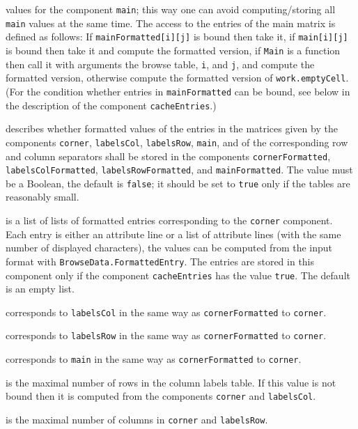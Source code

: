 \documentclass[a4paper,11pt]{report}
\begin{document}
{{{\begin{description}
values for the component \texttt{main}; this way one can avoid computing/storing all \texttt{main} values at the same time. The access to the entries of the main matrix is
defined as follows: If \texttt{mainFormatted[i][j]} is bound then take it, if \texttt{main[i][j]} is bound then take it and compute the formatted version, if \texttt{Main} is a function then call it with arguments the browse table, \texttt{i}, and \texttt{j}, and compute the formatted version, otherwise compute the formatted version
of \texttt{work.emptyCell}. (For the condition whether entries in \texttt{mainFormatted} can be bound, see below in the description of the component \texttt{cacheEntries}.) 
\item[{\texttt{cacheEntries}}]  describes whether formatted values of the entries in the matrices given by the
components \texttt{corner}, \texttt{labelsCol}, \texttt{labelsRow}, \texttt{main}, and of the corresponding row and column separators shall be stored in the
components \texttt{cornerFormatted}, \texttt{labelsColFormatted}, \texttt{labelsRowFormatted}, and \texttt{mainFormatted}. The value must be a Boolean, the default is \texttt{false}; it should be set to \texttt{true} only if the tables are reasonably small. 
\item[{\texttt{cornerFormatted}}]  is a list of lists of formatted entries corresponding to the \texttt{corner} component. Each entry is either an attribute line or a list of attribute lines
(with the same number of displayed characters), the values can be computed
from the input format with \texttt{BrowseData.FormattedEntry}.  The entries are stored in this component only if the component \texttt{cacheEntries} has the value \texttt{true}. The default is an empty list. 
\item[{\texttt{labelsColFormatted}}]  corresponds to \texttt{labelsCol} in the same way as \texttt{cornerFormatted} to \texttt{corner}. 
\item[{\texttt{labelsRowFormatted}}]  corresponds to \texttt{labelsRow} in the same way as \texttt{cornerFormatted} to \texttt{corner}. 
\item[{\texttt{mainFormatted}}]  corresponds to \texttt{main} in the same way as \texttt{cornerFormatted} to \texttt{corner}. 
\item[{\texttt{m0}}]  is the maximal number of rows in the column labels table. If this value is not
bound then it is computed from the components \texttt{corner} and \texttt{labelsCol}. 
\item[{\texttt{n0}}]  is the maximal number of columns in \texttt{corner} and \texttt{labelsRow}. 

\end{description}}}}
\end{document}
